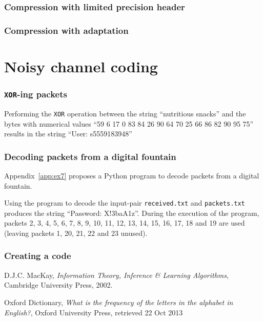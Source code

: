 \documentclass[10pt,a4paper,twoside,onecolumn]{article}
\newcommand*{\receivedTXT}{{\tt received.txt}\xspace}
\newcommand*{\packetsTXT}{{\tt packets.txt}\xspace}
\newcommand*{\XOR}{{\tt XOR}\xspace}
\begin{document}
\section{Compression with limited precision header}\label{sec:ex4}
\section{Compression with adaptation}\label{sec:ex5}


\part{Noisy channel coding}

\section{\XOR-ing packets}\label{sec:ex6}

Performing the \XOR operation between the string ``nutritious snacks'' and the
bytes with numerical values ``59 6 17 0 83 84 26 90 64 70 25 66 86 82 90 95 75''
results in the string ``User: s5559183948''

\section{Decoding packets from a digital fountain}\label{sec:ex7}

Appendix~\ref{app:ex7} proposes a Python program to decode packets from a
digital fountain.

Using the program to decode the input-pair \receivedTXT and \packetsTXT produces
the string ``Password: X!3baA1z''. During the execution of the program, packets
2, 3, 4, 5, 6, 7, 8, 9, 10, 11, 12, 13, 14, 15, 16, 17, 18 and 19 are used
(leaving packets 1, 20, 21, 22 and 23 unused).

\section{Creating a code}\label{sec:ex8}


\begin{thebibliography}{9}

    D.J.C. MacKay,
    \emph{Information Theory, Inference \& Learning Algorithms},
    Cambridge University Press,
    2002.

    Oxford Dictionary,
    \emph{What is the frequency of the letters in the alphabet in English?},
    Oxford University Press,
    retrieved 22 Oct 2013

\end{thebibliography}
\end{document}
